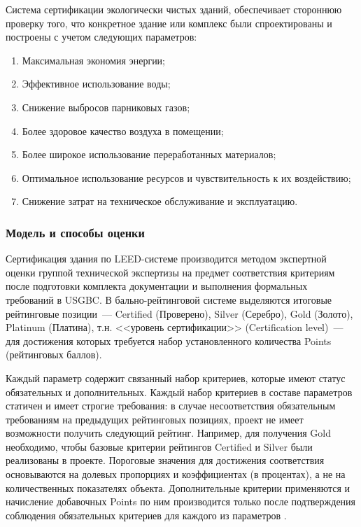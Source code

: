 Система сертификации экологически чистых зданий, обеспечивает стороннюю проверку того, что конкретное здание или комплекс были спроектированы и построены с учетом следующих параметров:
\begin{enumerate}[1)]
    \item Максимальная экономия энергии;
    \item Эффективное использование воды;
    \item Снижение выбросов парниковых газов;
    \item Более здоровое качество воздуха в помещении;
    \item Более широкое использование переработанных материалов;
    \item Оптимальное использование ресурсов и чувствительность к их воздействию;
    \item Снижение затрат на техническое обслуживание и эксплуатацию.
\end{enumerate}

\subsubsection*{Модель и способы оценки}
Сертификация здания по LEED-системе производится методом экспертной оценки группой технической экспертизы на предмет соответствия критериям после подготовки комплекта документации и выполнения формальных требований в USGBC.
В бально-рейтинговой системе выделяются итоговые рейтинговые позиции~--- Certified (Проверено), Silver (Серебро), Gold (Золото), Platinum (Платина), т.н. <<уровень сертификации>> (Certification level)~---
для достижения которых требуется набор установленного количества Points (рейтинговых баллов).

Каждый параметр содержит связанный набор критериев, которые имеют статус обязательных и дополнительных.
Каждый набор критериев в составе параметров статичен и имеет строгие требования: в случае несоответствия обязательным требованиям на предыдущих рейтинговых позициях,
проект не имеет возможности получить следующий рейтинг. Например, для получения Gold необходимо, чтобы базовые критерии рейтингов Certified и Silver были реализованы в проекте.
Пороговые значения для достижения соответствия основываются на долевых пропорциях и коэффициентах (в процентах), а не на количественных показателях объекта.
Дополнительные критерии применяются и начисление добавочных Points по ним производится только после подтверждения соблюдения обязательных критериев для каждого из параметров \cite{method_US_LEED}.
